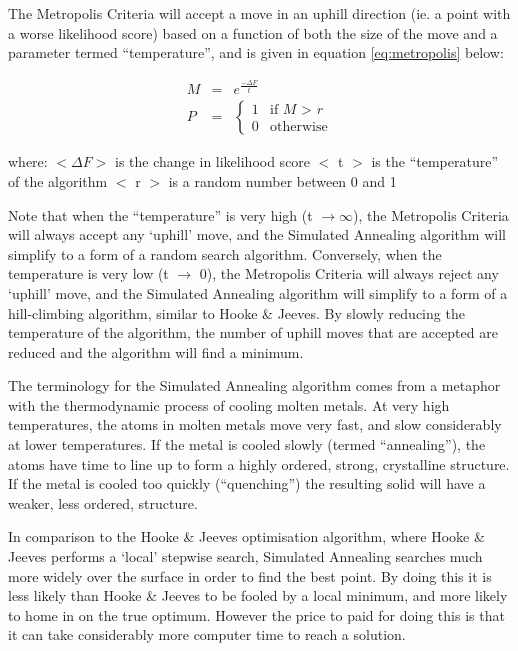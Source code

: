 \documentclass[]{book}
\begin{document}
The Metropolis Criteria will accept a move in an uphill direction (ie. a
point with a worse likelihood score) based on a function of both the
size of the move and a parameter termed ``temperature'', and is given in
equation \eqref{eq:metropolis} below:

\begin{equation}
\begin{aligned}
\label{eq:metropolis}
M & = & e^{\displaystyle \frac{-\Delta F} {t}} \nonumber \\
P & = &
\begin{cases}
1 & \textrm{if $M$ > $r$} \\
0 & \textrm{otherwise}
\end{cases}\end{aligned}\end{equation}

where: \(<\Delta F>\) is the change in likelihood score \(<\) t \(>\) is the
``temperature'' of the algorithm \(<\) r \(>\) is a random number between 0
and 1

Note that when the ``temperature'' is very high (t \(\rightarrow \infty\)),
the Metropolis Criteria will always accept any `uphill' move, and the
Simulated Annealing algorithm will simplify to a form of a random search
algorithm. Conversely, when the temperature is very low (t \(\rightarrow\)
0), the Metropolis Criteria will always reject any `uphill' move, and
the Simulated Annealing algorithm will simplify to a form of a
hill-climbing algorithm, similar to Hooke \& Jeeves. By slowly reducing
the temperature of the algorithm, the number of uphill moves that are
accepted are reduced and the algorithm will find a minimum.

The terminology for the Simulated Annealing algorithm comes from a
metaphor with the thermodynamic process of cooling molten metals. At
very high temperatures, the atoms in molten metals move very fast, and
slow considerably at lower temperatures. If the metal is cooled slowly
(termed ``annealing''), the atoms have time to line up to form a highly
ordered, strong, crystalline structure. If the metal is cooled too
quickly (``quenching'') the resulting solid will have a weaker, less
ordered, structure.

In comparison to the Hooke \& Jeeves optimisation algorithm, where Hooke
\& Jeeves performs a `local' stepwise search, Simulated Annealing
searches much more widely over the surface in order to find the best
point. By doing this it is less likely than Hooke \& Jeeves to be fooled
by a local minimum, and more likely to home in on the true optimum.
However the price to paid for doing this is that it can take
considerably more computer time to reach a solution.
\end{document}
